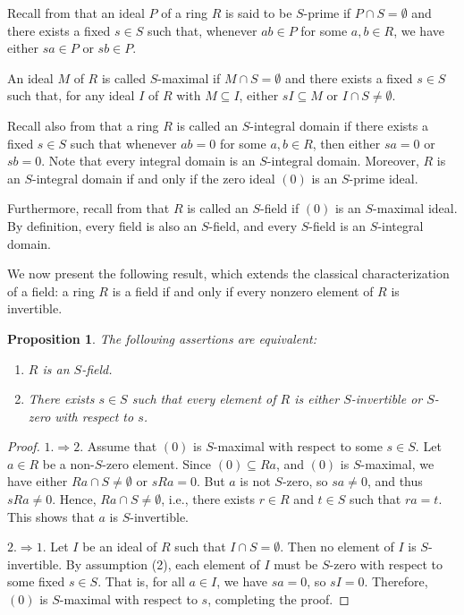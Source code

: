 \documentclass[12pt]{article}
\newtheorem{prop}[thm]{\bf Proposition}
\begin{document}
Recall from \cite{Yil1} that an ideal \( P \) of a ring \( R \) is said to be \( S \)-prime if \( P \cap S = \emptyset \) and there exists a fixed \( s \in S \) such that, whenever \( ab \in P \) for some \( a, b \in R \), we have either \( sa \in P \) or \( sb \in P \). 

An ideal \( M \) of \( R \) is called \( S \)-maximal if \( M \cap S = \emptyset \) and there exists a fixed \( s \in S \) such that, for any ideal \( I \) of \( R \) with \( M \subseteq I \), either \( sI \subseteq M \) or \( I \cap S \neq \emptyset \).

Recall also from \cite{Sev1} that a ring \( R \) is called an \( S \)-integral domain if there exists a fixed \( s \in S \) such that whenever \( ab = 0 \) for some \( a, b \in R \), then either \( sa = 0 \) or \( sb = 0 \). Note that every integral domain is an \( S \)-integral domain. Moreover, \( R \) is an \( S \)-integral domain if and only if the zero ideal \( (0) \) is an \( S \)-prime ideal.

Furthermore, recall from \cite[Definition 9]{Yil1} that \( R \) is called an \( S \)-field if \( (0) \) is an \( S \)-maximal ideal. By definition, every field is also an \( S \)-field, and every \( S \)-field is an \( S \)-integral domain.





We now present the following result, which extends the classical characterization of a field: a ring $R$ is a field if and only if every nonzero element of $R$ is invertible.

\begin{prop}
The following assertions are equivalent:
\begin{enumerate}
\item \( R \) is an \( S \)-field.
\item There exists \( s \in S \) such that every element of \( R \) is either \( S \)-invertible or \( S \)-zero with respect to \( s \).
\end{enumerate}
\end{prop}

\begin{proof}
$1. \Rightarrow 2.$ Assume that \( (0) \) is \( S \)-maximal with respect to some \( s \in S \). Let \( a \in R \) be a non-\( S \)-zero element. Since \( (0) \subseteq Ra \), and \( (0) \) is \( S \)-maximal, we have either \( Ra \cap S \neq \emptyset \) or \( sRa = 0 \). But \( a \) is not \( S \)-zero, so \( sa \neq 0 \), and thus \( sRa \neq 0 \). Hence, \( Ra \cap S \neq \emptyset \), i.e., there exists \( r \in R \) and \( t \in S \) such that \( ra = t \). This shows that \( a \) is \( S \)-invertible.


$2. \Rightarrow 1.$ Let \( I \) be an ideal of \( R \) such that \( I \cap S = \emptyset \). Then no element of \( I \) is \( S \)-invertible. By assumption (2), each element of \( I \) must be \( S \)-zero with respect to some fixed \( s \in S \). That is, for all \( a \in I \), we have \( sa = 0 \), so \( sI = 0 \). Therefore, \( (0) \) is \( S \)-maximal with respect to \( s \), completing the proof.
\end{proof}
\end{document}
